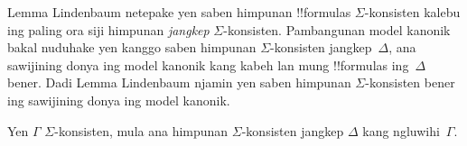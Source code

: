 \documentclass[../../../include/open-logic-section]{subfiles}
\begin{document}


Lemma Lindenbaum netepake yen saben himpunan !!{formula}s
$\Sigma$-konsisten kalebu ing paling ora siji himpunan \emph{jangkep}
$\Sigma$-konsisten. Pambangunan model kanonik bakal nuduhake yen kanggo
saben himpunan $\Sigma$-konsisten jangkep~$\Delta$, ana sawijining
donya ing model kanonik kang kabeh lan mung !!{formula}s
ing~$\Delta$ bener. Dadi Lemma Lindenbaum njamin yen saben himpunan
$\Sigma$-konsisten bener ing sawijining donya ing model kanonik.

\begin{thm}
  Yen $\Gamma$ $\Sigma$-konsisten, mula ana himpunan $\Sigma$-konsisten
  jangkep $\Delta$ kang ngluwihi~$\Gamma$.
\end{thm}
\end{document}
